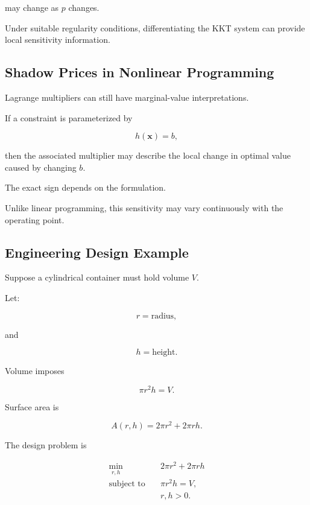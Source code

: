 may change as \(p\) changes.

Under suitable regularity conditions, differentiating the KKT system can
provide local sensitivity information.

\subsection{Shadow Prices in Nonlinear Programming}
\label{subsec:nlp-shadow-prices}

Lagrange multipliers can still have marginal-value interpretations.

If a constraint is parameterized by

\[
h(\mathbf{x})=b,
\]

then the associated multiplier may describe the local change in optimal
value caused by changing \(b\).

The exact sign depends on the formulation.

Unlike linear programming, this sensitivity may vary continuously with
the operating point.

\subsection{Engineering Design Example}
\label{subsec:nlp-engineering-design}

Suppose a cylindrical container must hold volume \(V\).

Let:

\[
r
=
\text{radius},
\]

and

\[
h
=
\text{height}.
\]

Volume imposes

\[
\boxed{
\pi r^2h=V.
}
\]

Surface area is

\[
\boxed{
A(r,h)
=
2\pi r^2
+
2\pi rh.
}
\]

The design problem is

\[
\boxed{
\begin{aligned}
\min_{r,h}
\quad&
2\pi r^2+2\pi rh
\\
\text{subject to}
\quad&
\pi r^2h=V,
\\
&
r,h>0.
\end{aligned}
}
\]

